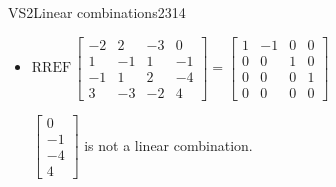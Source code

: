 \begin{exercise}{VS2}{Linear combinations}{2314}
\begin{exerciseAnswer}
\begin{itemize}
 
\item  

 \(
\mathrm{RREF}\, \left[\begin{array}{ccc|c}
-2 & 2 & -3 & 0 \\
1 & -1 & 1 & -1 \\
-1 & 1 & 2 & -4 \\
3 & -3 & -2 & 4
\end{array}\right] = \left[\begin{array}{ccc|c}
1 & -1 & 0 & 0 \\
0 & 0 & 1 & 0 \\
0 & 0 & 0 & 1 \\
0 & 0 & 0 & 0
\end{array}\right]
                        \) 

 

 \(\left[\begin{array}{c}
0 \\
-1 \\
-4 \\
4
\end{array}\right]\) is not a linear combination. 

 
\end{itemize}

     \end{exerciseAnswer}
 \end{exercise}


